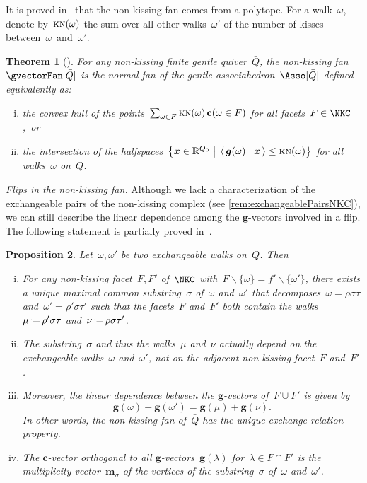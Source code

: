 \documentclass{amsart}
\newtheorem{theorem}{Theorem}[section]
\newtheorem{proposition}[theorem]{Proposition}
\theoremstyle{definition}
\newcommand{\R}{\mathbb{R}} %
\renewcommand{\b}[1]{{\boldsymbol{#1}}} %
\newcommand{\bigset}[2]{\big\{ #1 \;\big|\; #2 \big\}} %
\newcommand{\ssm}{\smallsetminus} %
\newcommand{\dotprod}[2]{\left\langle \, #1 \; \middle| \; #2 \, \right\rangle} %
\newcommand{\eqdef}{\mbox{\,\raisebox{0.2ex}{\scriptsize\ensuremath{\mathrm:}}\ensuremath{=}\,}} %
\newcommand{\darkblue}{\color{darkblue}} %
\newcommand{\defn}[1]{\textsl{\darkblue #1}} %
\newcommand{\para}[1]{\medskip\noindent\uline{\textit{#1.}}} %
\newcommand{\multiplicityVector}{\b{m}} %
\newcommand{\gvector}[1]{\b{g}(#1)} %
\newcommand{\cvector}[2]{\mathbf{c}(#2 \in #1)} %
\newcommand{\quiver}{\bar Q} %
\newcommand{\KN}{\textsc{kn}} %
\begin{document}
It is proved in~\cite[Thm.~4.27]{PaluPilaudPlamondon-nonkissing} that the non-kissing fan comes from a polytope.
For a walk~$\omega$, denote by~$\KN(\omega)$ the sum over all other walks~$\omega'$ of the number of kisses between~$\omega$~and~$\omega'$.

\begin{theorem}[{\cite[Thm.~4.27]{PaluPilaudPlamondon-nonkissing}}]
\label{thm:nonkissingAsso}
For any non-kissing finite gentle quiver~$\quiver$, the non-kissing fan~$\gvectorFan[\quiver]$ is the normal fan of the \defn{gentle associahedron}~$\Asso[\quiver]$ defined equivalently as:
\begin{enumerate}[(i)]
\item the convex hull of the points~$\sum_{\omega \in F} \KN(\omega) \, \cvector{F}{\omega}$ for all facets~${F \in \NKC}$,~or
\item the intersection of the halfspaces~$\bigset{\b{x} \in \R^{Q_0}}{\dotprod{\gvector{\omega}}{\b{x}} \le \KN(\omega)}$ for all walks~$\omega$ on~$\bar Q$.
\end{enumerate}
\end{theorem}

\para{Flips in the non-kissing fan}
%
Although we lack a characterization of the exchangeable pairs of the non-kissing complex (see \cref{rem:exchangeablePairsNKC}), we can still describe the linear dependence among the $\b{g}$-vectors involved in a flip.
The following statement is partially proved in~\cite[Thm.~4.17]{PaluPilaudPlamondon-nonkissing}.

\begin{proposition}
\label{prop:exchangeablePairsNKC}
Let~$\omega, \omega'$ be two exchangeable walks on~$\quiver$. Then
\begin{enumerate}[(i)]
\item For any non-kissing facet~$F, F'$ of~$\NKC$ with~$F \ssm \{\omega\} = f' \ssm \{\omega'\}$, there exists a unique maximal common substring~$\sigma$ of~$\omega$ and~$\omega'$ that decomposes~$\omega = \rho \sigma \tau$ and~$\omega' = \rho' \sigma \tau'$ such that the facets~$F$ and~$F'$ both contain the walks~$\mu \eqdef \rho' \sigma \tau$ and~$\nu \eqdef \rho \sigma \tau'$.
\item The substring~$\sigma$ and thus the walks~$\mu$ and~$\nu$ actually depend on the exchangeable walks~$\omega$ and~$\omega'$, not on the adjacent non-kissing facet~$F $ and~$F'$.
\item Moreover, the linear dependence between the $\b{g}$-vectors of~$F \cup F'$ is given by
\[
\gvector{\omega} + \gvector{\omega'} = \gvector{\mu} + \gvector{\nu}.
\]
In other words, the non-kissing fan of~$\quiver$ has the unique exchange relation property.
\item The $\b{c}$-vector orthogonal to all $\b{g}$-vectors~$\gvector{\lambda}$ for~$\lambda \in F \cap F'$ is the multiplicity vector~$\multiplicityVector_{\sigma}$ of the vertices of the substring~$\sigma$ of~$\omega$ and~$\omega'$.
\end{enumerate}
\end{proposition}
\end{document}
